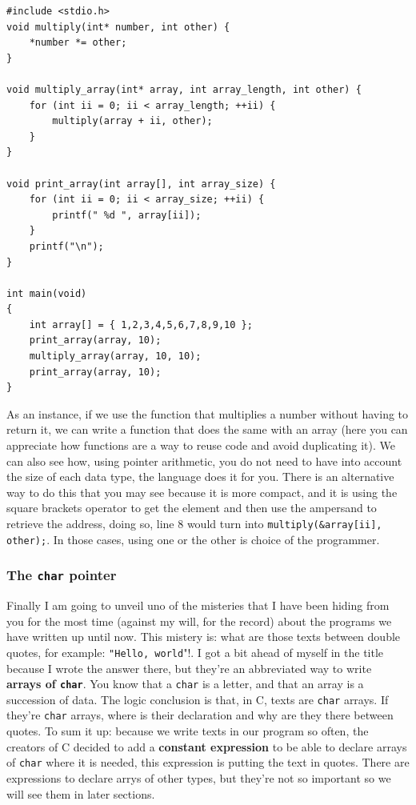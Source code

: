 \documentclass[a4paper]{article}
\begin{document}
\noindent
\begin{minipage}[H]{\linewidth}
\mbox{}
\begin{lstlisting}[style=C, label={lst:pointers4},
caption={Ejemplo práctico de aritmética de punteros}]
#include <stdio.h>
void multiply(int* number, int other) {
    *number *= other;
}

void multiply_array(int* array, int array_length, int other) {
    for (int ii = 0; ii < array_length; ++ii) {
        multiply(array + ii, other);
    }
}

void print_array(int array[], int array_size) {
    for (int ii = 0; ii < array_size; ++ii) {
        printf(" %d ", array[ii]);
    }
    printf("\n");
}

int main(void)
{
    int array[] = { 1,2,3,4,5,6,7,8,9,10 };
    print_array(array, 10);
    multiply_array(array, 10, 10);
    print_array(array, 10);
}
\end{lstlisting}
\end{minipage}

As an instance, if we use the function that multiplies a number without having
to return it, we can write a function that does the same with an array (here
you can appreciate how functions are a way to reuse code and avoid duplicating
it). We can also see how, using pointer arithmetic, you do not need to have into
account the size of each data type, the language does it for you. There is an
alternative way to do this that you may see because it is more compact, and it
is using the square brackets operator to get the element and then use the
ampersand to retrieve the address, doing so, line 8 would turn into
\lstinline[style=C]{multiply(&array[ii], other);}. In those cases, using one
or the other is choice of the programmer.

\subsubsection{The \texttt{char} pointer}
Finally I am going to unveil uno of the misteries that I have been hiding from
you for the most time (against my will, for the record) about the programs we
have written up until now. This mistery is: what are those texts between double
quotes, for example: \verb!"Hello, world!"!. I got a bit ahead of myself in the
title because I wrote the answer there, but they're an abbreviated way to write
\textbf{arrays of \texttt{char}}. You know that a \verb!char! is a letter, and
that an array is a succession of data. The logic conclusion is that, in C, texts
are \verb!char! arrays. If they're \verb!char! arrays, where is their
declaration and why are they there between quotes. To sum it up: because we
write texts in our program so often, the creators of C decided to add a
\textbf{constant expression} to be able to declare arrays of \verb!char!
where it is needed, this expression is putting the text in quotes.
There are expressions to declare arrys of other types, but they're not so
important so we will see them in later sections.
\end{document}
